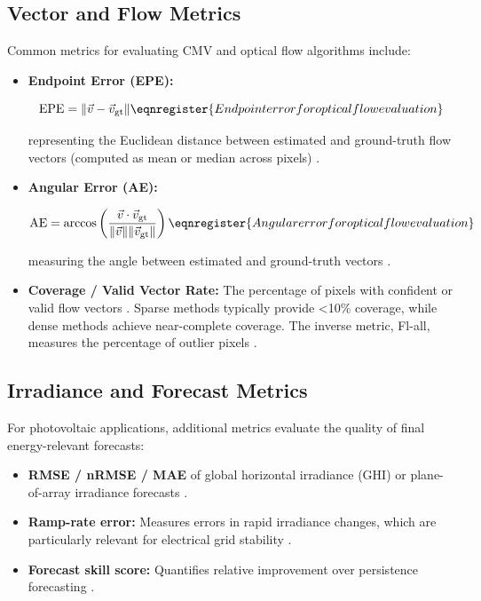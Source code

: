 \subsection{Vector and Flow Metrics}
Common metrics for evaluating CMV and optical flow algorithms include:
\begin{itemize}
 \item \textbf{Endpoint Error (EPE):} 
 
\begin{equation}
\mathrm{EPE} = \|\vec{v} - \vec{v}_{\mathrm{gt}}\|
\eqnregister{Endpoint error for optical flow evaluation}
\end{equation}

representing the Euclidean distance between estimated and ground-truth flow vectors (computed as mean or median across pixels) \cite{baker2011}.

  \item \textbf{Angular Error (AE):} 
  
\begin{equation}
\mathrm{AE} = \arccos\left(\dfrac{\vec{v}\cdot\vec{v}_{\mathrm{gt}}}{\|\vec{v}\|\|\vec{v}_{\mathrm{gt}}\|}\right)
\eqnregister{Angular error for optical flow evaluation}
\end{equation}

measuring the angle between estimated and ground-truth vectors \cite{barron1994,baker2011}.

  \item \textbf{Coverage / Valid Vector Rate:} The percentage of pixels 
  with confident or valid flow vectors \cite{kondermann2008,macaodha2013}. 
  Sparse methods typically provide <10\% coverage, while dense methods 
  achieve near-complete coverage. The inverse metric, Fl-all, measures the 
  percentage of outlier pixels \cite{menze2015,baker2011}.
\end{itemize}

\subsection{Irradiance and Forecast Metrics}
For photovoltaic applications, additional metrics evaluate the quality of final energy-relevant forecasts:
\begin{itemize}
  \item \textbf{RMSE / nRMSE / MAE} of global horizontal irradiance (GHI) or plane-of-array irradiance forecasts \cite{zhang2015}.
  \item \textbf{Ramp-rate error:} Measures errors in rapid irradiance changes, which are particularly relevant for electrical grid stability \cite{nouri2024ramp}.
  \item \textbf{Forecast skill score:} Quantifies relative improvement over persistence forecasting \cite{yang2020,voyant2018}.
\end{itemize}

